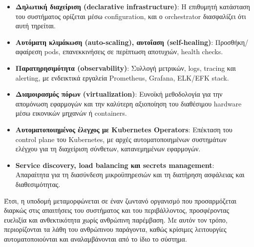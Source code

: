 \begin{itemize}
	\item \textbf{Δηλωτική διαχείριση (declarative infrastructure)}: Η επιθυμητή κατάσταση του συστήματος ορίζεται μέσω configuration, και ο orchestrator διασφαλίζει ότι αυτή τηρείται.
	\item \textbf{Αυτόματη κλιμάκωση (auto-scaling), αυτοΐαση (self-healing)}: Προσθήκη/αφαίρεση pods, επανεκκινήσεις σε περίπτωση αποτυχιών, health checks.
	\item \textbf{Παρατηρησιμότητα (observability)}: Συλλογή μετρικών, logs, tracing και alerting, με ενδεικτικά εργαλεία Prometheus, Grafana, ELK/EFK stack.
	\item \textbf{Διαμοιρασμός πόρων (virtualization)}: Ευνοϊκή μεθοδολογία για την απομόνωση εφαρμογών και την καλύτερη αξιοποίηση του διαθέσιμου hardware μέσω εικονικών μηχανών ή containers.
	\item \textbf{Αυτοματοποιημένος έλεγχος με Kubernetes Operators}: Επέκταση του control plane του Kubernetes, με αρχές αυτοματοποιημένων συστημάτων ελέγχου για τη διαχείριση σύνθετων, κατανεμημένων εφαρμογών.
	\item \textbf{Service discovery, load balancing και secrets management}: Απαραίτητα για τη διασύνδεση μικροϋπηρεσιών και τη διατήρηση ασφάλειας και διαθεσιμότητας.
\end{itemize}

Έτσι, η υποδομή μεταμορφώνεται σε έναν ζωντανό οργανισμό που προσαρμόζεται διαρκώς στις απαιτήσεις του συστήματος και του περιβάλλοντος, προσφέροντας ευελιξία και ανθεκτικότητα χωρίς ανθρώπινη παρέμβαση. Με αυτόν τον τρόπο, περιορίζονται τα λάθη του ανθρώπινου παράγοντα, καθώς κρίσιμες λειτουργίες αυτοματοποιούνται και αναλαμβάνονται από το ίδιο το σύστημα.

%
